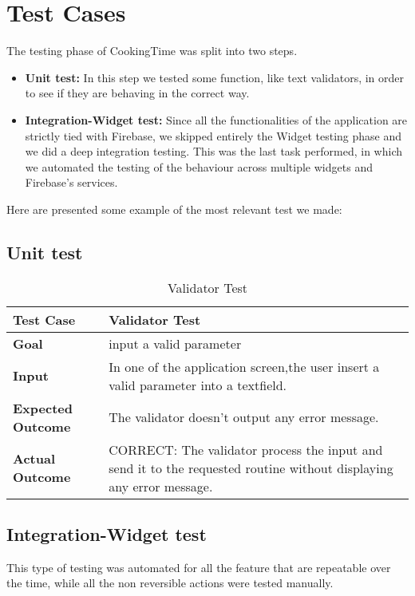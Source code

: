 \chapter{Test Cases}
The testing phase of CookingTime was split into two steps.

\begin{itemize}
	\item \textbf{Unit test:} In this step we tested some function, like text validators, in order to see if they are behaving in the correct way.
	\item \textbf{Integration-Widget test:} Since all the functionalities of the application are strictly tied with Firebase, we skipped entirely the Widget testing phase and we did a deep integration testing.
	This was the last task performed, in which we automated the testing of the behaviour across multiple widgets and Firebase's services.
\end{itemize}

Here are presented some example of the most relevant test we made:

\section{Unit test}
\begin{table}[H]
	\centering
	\begin{tabular}{|l|l|}
	\hline
	\textbf{Test Case}& Validator Test\\
	\hline
	\textbf{Goal}& input a valid parameter\\
	\hline
	\textbf{Input}& 
	\begin{minipage}{.7\linewidth}
	In one of the application screen,the user insert a valid parameter into a textfield.
	\end{minipage}\\
	\hline
	\textbf{Expected Outcome}& The validator doesn't output any error message.\\
	\hline
	\textbf{Actual Outcome}& 
	\begin{minipage}{.7\linewidth}
	CORRECT: The validator process the input and send it to the requested routine without displaying any error message.
	\end{minipage}\\
	\hline	
	\end{tabular}
	\caption{Validator Test}
\end{table}

\section{Integration-Widget test}
This type of testing was automated for all the feature that are repeatable over the time, while all the non reversible actions were tested manually.

